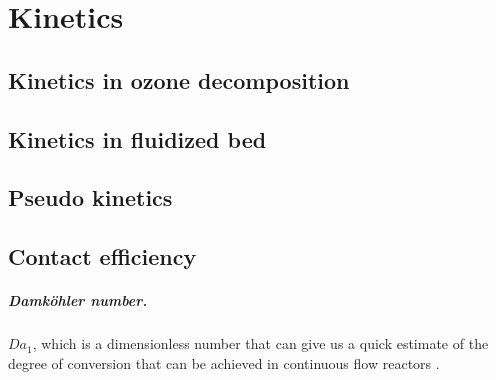 \chapter{Kinetics}
\section{Kinetics in ozone decomposition}

\section{Kinetics in fluidized bed}

\section{Pseudo kinetics}

\section{Contact efficiency}

\paragraph{Damköhler number.} 
$Da_1$, which is a dimensionless number that can give us a quick estimate of the degree of conversion that can be achieved in continuous flow reactors \cite{fogler2016element}.